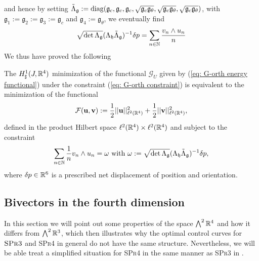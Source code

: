 and hence by setting $\tilde{\Lambda}_{\mathfrak{g}} := \operatorname{diag}(\mathfrak{g}_c, \mathfrak{g}_c, \mathfrak{g}_c, \sqrt{\mathfrak{g}_c \mathfrak{g}_{\theta}}, \sqrt{\mathfrak{g}_c \mathfrak{g}_{\theta}}, \sqrt{\mathfrak{g}_c  \mathfrak{g}_{\theta}})$, with $\mathfrak{g}_1 :=\mathfrak{g}_2 := \mathfrak{g}_3 := \mathfrak{g}_c$ and $\mathfrak{g}_4 := \mathfrak{g}_\theta$, we eventually find
\begin{equation}
\sqrt{\det \Lambda_{\mathfrak{g}}} (\Lambda_{\mathfrak{h}} \tilde{\Lambda}_{\mathfrak{g}})^{-1} \delta p = \sum_{n \in \mathbb{N}} \frac{v_n  \wedge u_n}{n}
\end{equation}
We thus have proved the following

\begin{proposition}
\label{prop: l2-minimization}
The $H_{\sharp}^1(J, \mathbb{R}^4)$ minimization of the functional $\mathcal{G}_U$ given by (\ref{eq: G-orth energy functional}) under the constraint (\ref{eq: G-orth constraint}) is equivalent to the minimization of the functional
\begin{equation}
\label{eq:l2-energy}
	\mathcal{F}(\mathbf{u}, \mathbf{v}) := \frac{1}{2} ||\mathbf{u} ||^2_{\ell^2(\mathbb{R}^4)} + \frac{1}{2} ||\mathbf{v}||^2_{\ell^2(\mathbb{R}^4)},
\end{equation}
defined in the product Hilbert space $\ell^2(\mathbb{R}^4) \times \ell^2(\mathbb{R}^4)$ and subject to the constraint
\begin{equation}
\label{eq:l2-constraint}
\sum_{n \in \mathbb{N}} \frac{1}{n} v_n \wedge u_n = \omega \text{ with } \omega := \sqrt{\det \Lambda_{\mathfrak{g}}}(\Lambda_{\mathfrak{h}} \tilde{\Lambda}_{\mathfrak{g}})^{-1} \delta p,
\end{equation}
where $\delta p \in \mathbb{R}^6$ is a prescribed net displacement of position and orientation.
\end{proposition}

\subsection{Bivectors in the fourth dimension}
In this section we will point out some properties of the space $\bigwedge^2 \mathbb{R}^4$ and how it differs from $\bigwedge^2 \mathbb{R}^3$, which then illustrates why the optimal control curves for $\textsc{SPr3}$ and \textsc{SPr4} in general do not have the same structure. Nevertheless, we will be able treat a simplified situation for \textsc{SPr4} in the same manner as \textsc{SPr3} in \cite{Alouges2017}.

